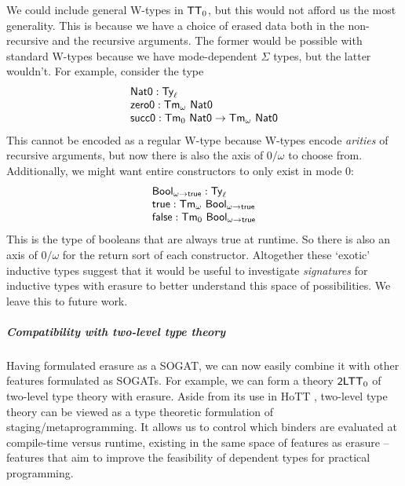 \documentclass[10pt,a4paper]{article}
\theoremstyle{definition}
\theoremstyle{remark}
\newcommand{\s}[1]{{\ensuremath{\textsf{\upshape #1}}}\xspace}
\newcommand{\Ty}{\s{Ty}}
\newcommand{\Tm}{\s{Tm}}
\newcommand{\ZTT}{\ensuremath{\s{TT}_0}\xspace}
\begin{document}
We could include general W-types \cite{Hugunin2021-ui} in \ZTT, but this would
not afford us the most generality. This is because we have a choice of erased
data both in the non-recursive and the recursive arguments. The former would be
possible with standard W-types because we have mode-dependent $\Sigma$ types,
but the latter wouldn't. For example, consider the type
\[
\begin{array}{l}
  \s{Nat0} : \Ty_\ell \\
  \s{zero0} : \Tm_\omega\ \s{Nat0} \\
  \s{succ0} : \Tm_0\ \s{Nat0} \to \Tm_\omega\ \s{Nat0} \\
\end{array}\]
This cannot be encoded as a regular W-type because W-types encode \emph{arities}
of recursive arguments, but now there is also the axis of $0/\omega$ to choose
from. Additionally, we might want entire constructors to only exist in mode 0:
\[
\begin{array}{l}
  \s{Bool}_{\omega\to \s{true}} : \Ty_\ell \\
  \s{true} : \Tm_\omega\ \s{Bool}_{\omega\to \s{true}} \\
  \s{false} : \Tm_0\ \s{Bool}_{\omega\to \s{true}} \\
\end{array}\]
This is the type of booleans that are always true at runtime. So there is also
an axis of $0/\omega$ for the return sort of each constructor. Altogether these
`exotic' inductive types suggest that it would be useful to investigate
\emph{signatures} for inductive types with erasure to better understand this
space of possibilities. We leave this to future work.

\subparagraph{Compatibility with two-level type theory}\label{ssub:2ltt}

Having formulated erasure as a SOGAT, we can now easily combine it with other
features formulated as SOGATs. For example, we can form a theory $\s{2LTT}_0$ of
two-level type theory \cite{Kovacs2022-rf} with erasure. Aside from its use in
HoTT \cite{Annenkov2023-vk}, two-level type theory can be viewed as a type
theoretic formulation of staging/metaprogramming. It allows us to control which
binders are evaluated at compile-time versus runtime, existing in the same space
of features as erasure -- features that aim to improve the feasibility of
dependent types for practical programming.
\end{document}
